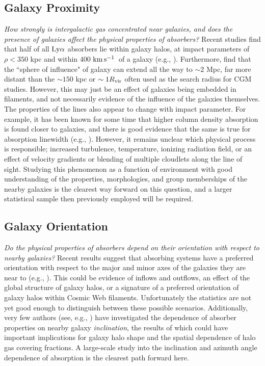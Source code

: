 \documentclass[twocolumn,tighten]{aastex62}
\newcommand{\kms}{$\rm km\, s^{-1}$}
\begin{document}
\subsection{Galaxy Proximity}
\emph{How strongly is intergalactic gas concentrated near galaxies, and does the presence of galaxies affect the physical properties of absorbers?} Recent studies find that half of all $\rm Ly\alpha$ absorbers lie within galaxy halos, at impact parameters of $\rho <350$ kpc and within $400$ \kms~of a galaxy (e.g., \citealt{cote2005, prochaska2006, wakker2009}). Furthermore, \cite{sorini2018} find that the ``sphere of influence" of galaxy can extend all the way to $\sim 2$ Mpc, far more distant than the $\sim150$ kpc or $\sim 1 R_{\rm vir}$ often used as the search radius for CGM studies. However, this may just be an effect of galaxies being embedded in filaments, and not necessarily evidence of the influence of the galaxies themselves. The properties of the lines also appear to change with impact parameter. For example, it has been known for some time that higher column density absorption is found closer to galaxies, and there is good evidence that the same is true for absorption linewidth (e.g., \citealt{wakker2009, prochaska2011}). However, it remains unclear which physical process is responsible; increased turbulence, temperature, ionizing radiation field, or an effect of velocity gradients or blending of multiple cloudlets along the line of sight. Studying this phenomenon as a function of environment with good understanding of the properties, morphologies, and group memberships of the nearby galaxies is the clearest way forward on this question, and a larger statistical sample then previously employed will be required.


\subsection{Galaxy Orientation}
\emph{Do the physical properties of absorbers depend on their orientation with respect to nearby galaxies?} Recent results suggest that absorbing systems have a preferred orientation with respect to the major and minor axes of the galaxies they are near to (e.g., \citealt{kacprzak2011_inclination, kacprzak2012}). This could be evidence of inflows and outflows, an effect of the global structure of galaxy halos, or a signature of a preferred orientation of galaxy halos within Cosmic Web filaments. Unfortunately the statistics are not yet good enough to distinguish between these possible scenarios. Additionally, very few authors (see, e.g., \citealt{mathes2014, bordoloi2014}) have investigated the dependence of absorber properties on nearby galaxy \emph{inclination}, the results of which could have important implications for galaxy halo shape and the spatial dependence of halo gas covering fractions. A large-scale study into the inclination and azimuth angle dependence of absorption is the clearest path forward here.
\end{document}
